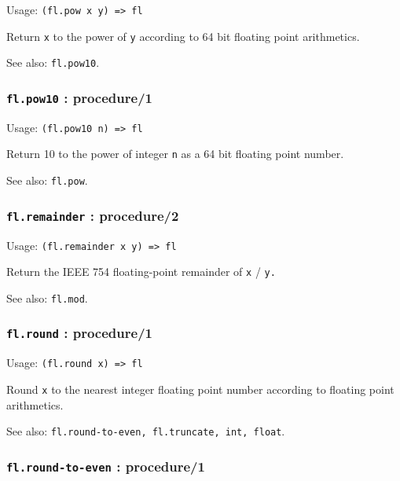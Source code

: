 \documentclass[
]{article}
\newcommand{\passthrough}[1]{#1}
\begin{document}
Usage: \passthrough{\lstinline!(fl.pow x y) => fl!}

Return \passthrough{\lstinline!x!} to the power of
\passthrough{\lstinline!y!} according to 64 bit floating point
arithmetics.

See also: \passthrough{\lstinline!fl.pow10!}.

\hypertarget{fl.pow10-procedure1}{%
\subsubsection{\texorpdfstring{\texttt{fl.pow10} :
procedure/1}{fl.pow10 : procedure/1}}\label{fl.pow10-procedure1}}

Usage: \passthrough{\lstinline!(fl.pow10 n) => fl!}

Return 10 to the power of integer \passthrough{\lstinline!n!} as a 64
bit floating point number.

See also: \passthrough{\lstinline!fl.pow!}.

\hypertarget{fl.remainder-procedure2}{%
\subsubsection{\texorpdfstring{\texttt{fl.remainder} :
procedure/2}{fl.remainder : procedure/2}}\label{fl.remainder-procedure2}}

Usage: \passthrough{\lstinline!(fl.remainder x y) => fl!}

Return the IEEE 754 floating-point remainder of
\passthrough{\lstinline!x!} / \passthrough{\lstinline!y.!}

See also: \passthrough{\lstinline!fl.mod!}.

\hypertarget{fl.round-procedure1}{%
\subsubsection{\texorpdfstring{\texttt{fl.round} :
procedure/1}{fl.round : procedure/1}}\label{fl.round-procedure1}}

Usage: \passthrough{\lstinline!(fl.round x) => fl!}

Round \passthrough{\lstinline!x!} to the nearest integer floating point
number according to floating point arithmetics.

See also:
\passthrough{\lstinline!fl.round-to-even, fl.truncate, int, float!}.

\hypertarget{fl.round-to-even-procedure1}{%
\subsubsection{\texorpdfstring{\texttt{fl.round-to-even} :
procedure/1}{fl.round-to-even : procedure/1}}\label{fl.round-to-even-procedure1}}
\end{document}
